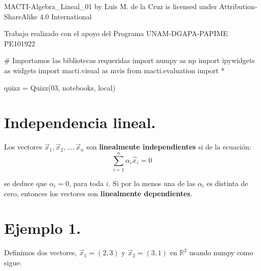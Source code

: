\documentclass[
  letterpaper,
  DIV=11,
  numbers=noendperiod]{scrreprt}
\newenvironment{Shaded}{\begin{snugshade}}{\end{snugshade}}
\newcommand{\CommentTok}[1]{\textcolor[rgb]{0.37,0.37,0.37}{#1}}
\newcommand{\ImportTok}[1]{\textcolor[rgb]{0.00,0.46,0.62}{#1}}
\newcommand{\NormalTok}[1]{\textcolor[rgb]{0.00,0.23,0.31}{#1}}
\newcommand{\OperatorTok}[1]{\textcolor[rgb]{0.37,0.37,0.37}{#1}}
\newcommand{\StringTok}[1]{\textcolor[rgb]{0.13,0.47,0.30}{#1}}
\begin{document}
MACTI-Algebra\_Lineal\_01 by Luis M. de la Cruz is licensed under
Attribution-ShareAlike 4.0 International

Trabajo realizado con el apoyo del Programa UNAM-DGAPA-PAPIME PE101922

\begin{Shaded}
\begin{Highlighting}[]
\CommentTok{\# Importamos las bibliotecas requeridas}
\ImportTok{import}\NormalTok{ numpy }\ImportTok{as}\NormalTok{ np}
\ImportTok{import}\NormalTok{ ipywidgets }\ImportTok{as}\NormalTok{ widgets}
\ImportTok{import}\NormalTok{ macti.visual }\ImportTok{as}\NormalTok{ mvis}
\ImportTok{from}\NormalTok{ macti.evaluation }\ImportTok{import} \OperatorTok{*}
\end{Highlighting}
\end{Shaded}

\begin{Shaded}
\begin{Highlighting}[]
\NormalTok{quizz }\OperatorTok{=}\NormalTok{ Quizz(}\StringTok{\textquotesingle{}03\textquotesingle{}}\NormalTok{, }\StringTok{\textquotesingle{}notebooks\textquotesingle{}}\NormalTok{, }\StringTok{\textquotesingle{}local\textquotesingle{}}\NormalTok{)}
\end{Highlighting}
\end{Shaded}

\section{Independencia lineal.}\label{independencia-lineal.}

Los vectores \(\vec{x}_1, \vec{x}_2, \dots, \vec{x}_n\) son
\textbf{linealmente independientes} si de la ecuación: \[
\sum_{i=1}^n \alpha_i \vec{x}_i =  0 \tag{1}
\]

se deduce que \(\alpha_i = 0\), para toda \(i\). Si por lo menos una de
las \(\alpha_i\) es distinta de cero, entonces los vectores son
\textbf{linealmente dependientes}.

\section{\texorpdfstring{\textbf{Ejemplo
1.}}{Ejemplo 1.}}\label{ejemplo-1.}

Definimos dos vectores, \(\vec{x}_1 = (2, 3)\) y \(\vec{x}_2 = (3, 1)\)
en \(\mathbb{R}^2\) usando numpy como sigue:
\end{document}
